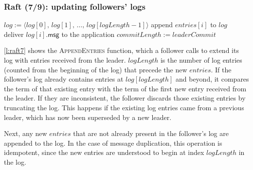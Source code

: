 \begin{frame}
    \label{s:raft7}
    \frametitle{Raft (7/9): updating followers' logs}
    \footnotesize
    \begin{algorithmic}
                    \State $\mathit{log} := \langle\mathit{log}[0],\, \mathit{log}[1],\, \dots,\, \mathit{log}[\mathit{logLength} - 1]\rangle$
                \EndIf
            \EndIf
                    \State append $\mathit{entries}[i]$ to $\mathit{log}$
                \EndFor
            \EndIf
                    \State deliver $\mathit{log}[i].\mathsf{msg}$ to the application
                \EndFor
                \State $\mathit{commitLength} := \mathit{leaderCommit}$
            \EndIf
        \EndFunction
        \State
    \end{algorithmic}
\end{frame}
\label{l:raft7}

\autoref{l:raft7} shows the \textsc{AppendEntries} function, which a follower calls to extend its log with entries received from the leader.
$\mathit{logLength}$ is the number of log entries (counted from the beginning of the log) that precede the new $\mathit{entries}$.
If the follower's log already contains entries at $\mathit{log}[\mathit{logLength}]$ and beyond, it compares the term of that existing entry with the term of the first new entry received from the leader.
If they are inconsistent, the follower discards those existing entries by truncating the log.
This happens if the existing log entries came from a previous leader, which has now been superseded by a new leader.

Next, any new $\mathit{entries}$ that are not already present in the follower's log are appended to the log.
In the case of message duplication, this operation is idempotent, since the new entries are understood to begin at index $\mathit{logLength}$ in the log.


